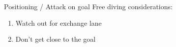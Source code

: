 \begin{frame}{Positioning / Attack on goal}
    Free diving considerations:

    \begin{enumerate}
        \item Watch out for exchange lane
        \item Don't get close to the goal
    \end{enumerate}
\end{frame}